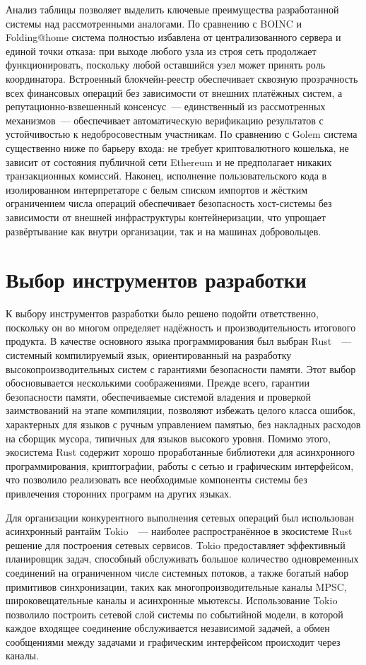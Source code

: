 \documentclass[a4paper,11pt]{extarticle}
\begin{document}
Анализ таблицы позволяет выделить ключевые преимущества разработанной системы
над рассмотренными аналогами. По сравнению с BOINC и Folding@home система
полностью избавлена от централизованного сервера и единой точки отказа: при
выходе любого узла из строя сеть продолжает функционировать, поскольку любой
оставшийся узел может принять роль координатора. Встроенный блокчейн-реестр
обеспечивает сквозную прозрачность всех финансовых операций без зависимости от
внешних платёжных систем, а репутационно-взвешенный консенсус~--- единственный
из рассмотренных механизмов~--- обеспечивает автоматическую верификацию
результатов с устойчивостью к недобросовестным участникам. По сравнению с Golem
система существенно ниже по барьеру входа: не требует криптовалютного кошелька,
не зависит от состояния публичной сети Ethereum и не предполагает никаких
транзакционных комиссий. Наконец, исполнение пользовательского кода в
изолированном интерпретаторе с белым списком импортов и жёстким ограничением
числа операций обеспечивает безопасность хост-системы без зависимости от
внешней инфраструктуры контейнеризации, что упрощает развёртывание как внутри
организации, так и на машинах добровольцев.

\pagebreak

\section{Выбор инструментов разработки}

К выбору инструментов разработки было решено подойти ответственно, поскольку
он во многом определяет надёжность и производительность итогового продукта. В
качестве основного языка программирования был выбран Rust~\cite{rust_book}~---
системный компилируемый язык, ориентированный на разработку
высокопроизводительных систем с гарантиями безопасности памяти. Этот выбор
обосновывается несколькими соображениями. Прежде всего, гарантии безопасности
памяти, обеспечиваемые системой владения и проверкой заимствований на этапе
компиляции, позволяют избежать целого класса ошибок, характерных для языков с
ручным управлением памятью, без накладных расходов на сборщик мусора, типичных
для языков высокого уровня. Помимо этого, экосистема Rust содержит хорошо
проработанные библиотеки для асинхронного программирования, криптографии,
работы с сетью и графическим интерфейсом, что позволило реализовать все
необходимые компоненты системы без привлечения сторонних программ на других
языках.

Для организации конкурентного выполнения сетевых операций был использован
асинхронный рантайм Tokio~\cite{tokio_rs}~--- наиболее распространённое в
экосистеме Rust решение для построения сетевых сервисов. Tokio предоставляет
эффективный планировщик задач, способный обслуживать большое количество
одновременных соединений на ограниченном числе системных потоков, а также
богатый набор примитивов синхронизации, таких как многопроизводительные каналы
MPSC, широковещательные каналы и асинхронные мьютексы. Использование Tokio
позволило построить сетевой слой системы по событийной модели, в которой каждое
входящее соединение обслуживается независимой задачей, а обмен сообщениями
между задачами и графическим интерфейсом происходит через каналы.
\end{document}
